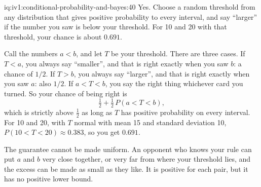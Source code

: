 \begin{solution}{iq:iv1:conditional-probability-and-bayes:40}
Yes. Choose a random threshold from any distribution that gives positive probability to every interval, and say ``larger'' if the number you saw is below your threshold. For 10 and 20 with that threshold, your chance is about $0.691$.

Call the numbers $a < b$, and let $T$ be your threshold. There are three cases. If $T < a$, you always say ``smaller'', and that is right exactly when you saw $b$: a chance of $1/2$. If $T > b$, you always say ``larger'', and that is right exactly when you saw $a$: also $1/2$. If $a < T < b$, you say the right thing whichever card you turned. So your chance of being right is
\[
\tfrac12 + \tfrac12\, P(a < T < b),
\]
which is strictly above $\tfrac12$ as long as $T$ has positive probability on every interval. For 10 and 20, with $T$ normal with mean 15 and standard deviation 10, $P(10 < T < 20) \approx 0.383$, so you get $0.691$.

The guarantee cannot be made uniform. An opponent who knows your rule can put $a$ and $b$ very close together, or very far from where your threshold lies, and the excess can be made as small as they like. It is positive for each pair, but it has no positive lower bound.

\end{solution}
